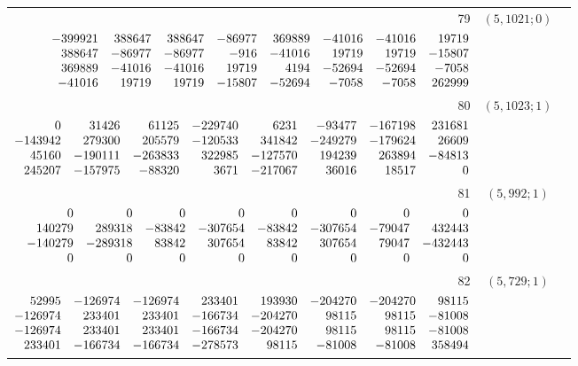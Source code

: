 \documentclass[11pt]{article}
\theoremstyle{remark}
\numberwithin{equation}{section}
\begin{document}
\begin{longtable}{rcl}
79 & $(5,1021;0)$ & \begin{tabular}[t]{@{}l@{}}$w_i=\displaystyle \frac{2083331004868951}{103204847977077196800000000000000000}$\\[3pt]{\scriptsize$\begin{array}{@{}rrrrrrrr@{}}-399921 & 388647 & 388647 & -86977 & 369889 & -41016 & -41016 & 19719\\388647 & -86977 & -86977 & -916 & -41016 & 19719 & 19719 & -15807\\369889 & -41016 & -41016 & 19719 & 4194 & -52694 & -52694 & -7058\\-41016 & 19719 & 19719 & -15807 & -52694 & -7058 & -7058 & 262999\end{array}$}\end{tabular}\\[8pt]
80 & $(5,1023;1)$ & \begin{tabular}[t]{@{}l@{}}$w_i=\displaystyle \frac{207266842177493}{1492894019299666718750000000000000}$\\[3pt]{\scriptsize$\begin{array}{@{}rrrrrrrr@{}}0 & 31426 & 61125 & -229740 & 6231 & -93477 & -167198 & 231681\\-143942 & 279300 & 205579 & -120533 & 341842 & -249279 & -179624 & 26609\\45160 & -190111 & -263833 & 322985 & -127570 & 194239 & 263894 & -84813\\245207 & -157975 & -88320 & 3671 & -217067 & 36016 & 18517 & 0\end{array}$}\end{tabular}\\[8pt]
81 & $(5,992;1)$ & \begin{tabular}[t]{@{}l@{}}$w_i=\displaystyle \frac{2397606624605478069}{1076151862254430798976000000000000000}$\\[3pt]{\scriptsize$\begin{array}{@{}rrrrrrrr@{}}0 & 0 & 0 & 0 & 0 & 0 & 0 & 0\\140279 & 289318 & -83842 & -307654 & -83842 & -307654 & -79047 & 432443\\-140279 & -289318 & 83842 & 307654 & 83842 & 307654 & 79047 & -432443\\0 & 0 & 0 & 0 & 0 & 0 & 0 & 0\end{array}$}\end{tabular}\\[8pt]
82 & $(5,729;1)$ & \begin{tabular}[t]{@{}l@{}}$w_i=\displaystyle \frac{21910999623230153}{39733433441334633400000000000000000}$\\[3pt]{\scriptsize$\begin{array}{@{}rrrrrrrr@{}}52995 & -126974 & -126974 & 233401 & 193930 & -204270 & -204270 & 98115\\-126974 & 233401 & 233401 & -166734 & -204270 & 98115 & 98115 & -81008\\-126974 & 233401 & 233401 & -166734 & -204270 & 98115 & 98115 & -81008\\233401 & -166734 & -166734 & -278573 & 98115 & -81008 & -81008 & 358494\end{array}$}\end{tabular}\\[8pt]

\end{longtable}
\end{document}
